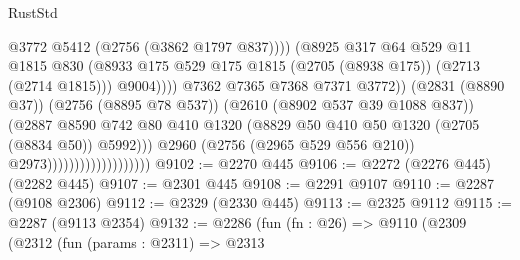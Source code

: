 \begin{lexlean}{RustStd}
\begin{coremodule}
                                                          @3772
                                                          @5412
                                                          (@2756 (@3862 @1797 @837))))
                                                      (@8925
                                                        @317
                                                        @64
                                                        @529
                                                        @11
                                                        @1815
                                                        @830
                                                        (@8933
                                                          @175
                                                          @529
                                                          @175
                                                          @1815
                                                          (@2705 (@8938 @175))
                                                          (@2713 (@2714 @1815)))
                                                        @9004))))
                                                @7362
                                                @7365
                                                @7368
                                                @7371
                                                @3772))
                                            (@2831 (@8890 @37))
                                            (@2756 (@8895 @78 @537))
                                            (@2610 (@8902 @537 @39 @1088 @837))
                                            (@2887
                                              @8590
                                              @742
                                              @80
                                              @410
                                              @1320
                                              (@8829 @50 @410 @50 @1320 (@2705 (@8834 @50)) @5992)))
                                          @2960
                                          (@2756 (@2965 @529 @556 @210))
                                          @2973)))))))))))))))))))
@9102 := @2270 @445
@9106 := @2272 (@2276 @445) (@2282 @445)
@9107 := @2301 @445
@9108 := @2291 @9107
@9110 := @2287 (@9108 @2306)
@9112 := @2329 (@2330 @445)
@9113 := @2325 @9112
@9115 := @2287 (@9113 @2354)
@9132 := @2286
    (fun (fn : @26) =>
    @9110
      (@2309
        (@2312
          (fun (params : @2311) =>
          @2313

\end{coremodule}
\end{lexlean}
